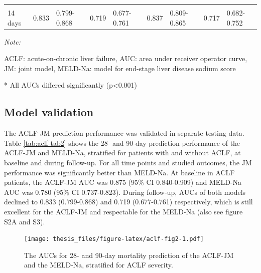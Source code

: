 \documentclass[11pt,english,]{book} %
\begin{document}
\begin{landscape}
\begin{table}
{\begin{threeparttable}
\begin{tabular}[t]{lrlrlrlrl}
\hspace{1em}\cellcolor{gray!6}{7 days} & \cellcolor{gray!6}{0.861} & \cellcolor{gray!6}{0.832-0.891} & \cellcolor{gray!6}{0.755} & \cellcolor{gray!6}{0.717-0.792} & \cellcolor{gray!6}{0.835} & \cellcolor{gray!6}{0.806-0.864} & \cellcolor{gray!6}{0.722} & \cellcolor{gray!6}{0.687-0.757}\\
\hspace{1em}14 days & 0.833 & 0.799-0.868 & 0.719 & 0.677-0.761 & 0.837 & 0.809-0.865 & 0.717 & 0.682-0.752\\
\bottomrule
\end{tabular}
\begin{tablenotes}
\item \textit{Note: } 
\item ACLF: acute-on-chronic liver failure, AUC: area under receiver operator curve, JM: joint model, MELD-Na: model for end-stage liver disease sodium score
\item[*] All AUCs differed significantly (p<0.001)
\end{tablenotes}
\end{threeparttable}}
\end{table}
\end{landscape}

\hypertarget{model-validation}{%
\subsection*{Model validation}\label{model-validation}}

The ACLF-JM prediction performance was validated in separate testing data. Table \ref{tab:aclf-tab2} shows the 28- and 90-day prediction performance of the ACLF-JM and MELD-Na, stratified for patients with and without ACLF, at baseline and during follow-up. For all time points and studied outcomes, the JM performance was significantly better than MELD-Na. At baseline in ACLF patients, the ACLF-JM AUC was 0.875 (95\% CI 0.840-0.909) and MELD-Na AUC was 0.780 (95\% CI 0.737-0.823). During follow-up, AUCs of both models declined to 0.833 (0.799-0.868) and 0.719 (0.677-0.761) respectively, which is still excellent for the ACLF-JM and respectable for the MELD-Na (also see figure S2A and S3).

\begin{figure}
\centering
\texttt{[image: thesis\_files/figure-latex/aclf-fig2-1.pdf]}
\caption{\label{fig:aclf-fig2}The AUCs for 28- and 90-day mortality prediction of the ACLF-JM and the MELD-Na, stratified for ACLF severity.}
\end{figure}
\end{document}
